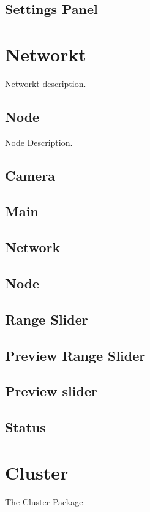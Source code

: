 \subsection{Settings Panel}


\section{Networkt}
Networkt description.
\subsection{Node}
Node Description.
\subsection{Camera}
\subsection{Main}
\subsection{Network}
\subsection{Node}
\subsection{Range Slider}
\subsection{Preview Range Slider}
\subsection{Preview slider}
\subsection{Status}


\section{Cluster}
The Cluster Package

